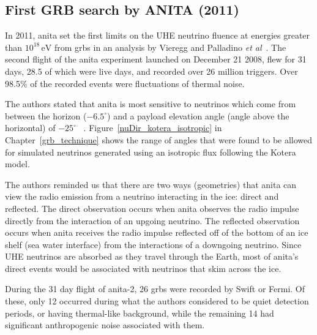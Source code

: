 \subsection{First GRB search by ANITA (2011)}

In 2011, \gls{anita} set the first limits on the UHE neutrino fluence at energies greater than $10^{18} \, \mathrm{eV}$ from \gls{grbs} in an analysis by Vieregg and Palladino \textit{et al}~\cite{anita_grb}. The second flight of the \gls{anita} experiment launched on December 21 2008, flew for 31 days, 28.5 of which were live days, and recorded over 26 million triggers. Over 98.5\% of the recorded events were fluctuations of thermal noise. 

The authors stated that \gls{anita} is most sensitive to neutrinos which come from between the horizon ($-6.5^{\circ}$) and a payload elevation angle (angle above the horizontal) of $-25^{\circ}$ ~\cite{anita_grb}. Figure~\ref{nuDir_kotera_isotropic} in Chapter~\ref{grb_technique} shows the range of angles that were found to be allowed for simulated neutrinos generated using an isotropic flux following the Kotera model. 

The authors reminded us that there are two ways (geometries) that \gls{anita} can view the radio emission from a neutrino interacting in the ice: direct and reflected. The direct observation occurs when \gls{anita} observes the radio impulse directly from the interaction of an upgoing neutrino. The reflected observation occurs when \gls{anita} receives the radio impulse reflected off of the bottom of an ice shelf (sea water interface) from the interactions of a downgoing neutrino. Since UHE neutrinos are absorbed as they travel through the Earth, most of \gls{anita}'s direct events would be associated with neutrinos that skim across the ice. 


During the 31 day flight of \gls{anita}-2, 26 \gls{grbs} were recorded by Swift or Fermi. Of these, only 12 occurred during what the authors considered to be quiet detection periods, or having thermal-like background, while the remaining 14 had significant anthropogenic noise associated with them. 


